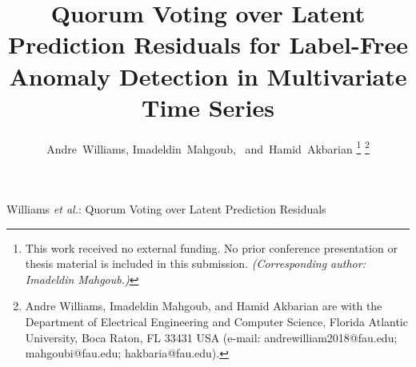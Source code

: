 \title{Quorum Voting over Latent Prediction Residuals for Label-Free Anomaly Detection in Multivariate Time Series}

\author{Andre~Williams, Imadeldin~Mahgoub,~ and~Hamid~Akbarian%
\thanks{This work received no external funding. No prior conference presentation or thesis material is included in this submission. \textit{(Corresponding author: Imadeldin Mahgoub.)}}%
\thanks{Andre Williams, Imadeldin Mahgoub, and Hamid Akbarian are with the Department of Electrical Engineering and Computer Science, Florida Atlantic University, Boca Raton, FL 33431 USA (e-mail: andrewilliam2018@fau.edu; mahgoubi@fau.edu; hakbaria@fau.edu).}}

%
{Williams \MakeLowercase{\textit{et al.}}: Quorum Voting over Latent Prediction Residuals}

\maketitle
